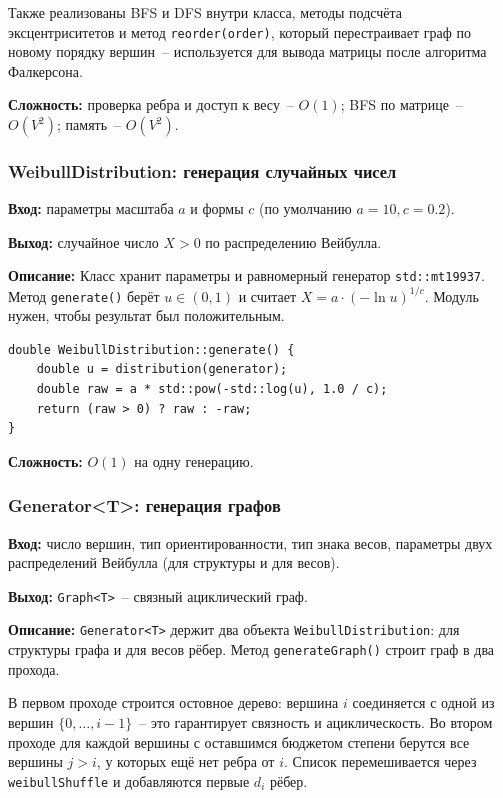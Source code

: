 Также реализованы BFS и DFS внутри класса, методы подсчёта эксцентриситетов
и метод \texttt{reorder(order)}, который перестраивает граф по новому порядку
вершин~-- используется для вывода матрицы после алгоритма Фалкерсона.

\textbf{Сложность:} проверка ребра и доступ к весу~-- $O(1)$;
BFS по матрице~-- $O(V^2)$; память~-- $O(V^2)$.

\subsubsection{WeibullDistribution: генерация случайных чисел}

\textbf{Вход:} параметры масштаба $a$ и формы $c$ (по умолчанию $a=10, c=0.2$).

\textbf{Выход:} случайное число $X > 0$ по распределению Вейбулла.

\textbf{Описание:} Класс хранит параметры и равномерный генератор
\texttt{std::mt19937}. Метод \texttt{generate()} берёт $u \in (0,1)$
и считает $X = a \cdot (-\ln u)^{1/c}$.
Модуль нужен, чтобы результат был положительным.

\begin{lstlisting}[style=cstyle, caption={Генерация числа по распределению Вейбулла (weibull.cpp)}]
double WeibullDistribution::generate() {
    double u = distribution(generator);
    double raw = a * std::pow(-std::log(u), 1.0 / c);
    return (raw > 0) ? raw : -raw;
}
\end{lstlisting}

\textbf{Сложность:} $O(1)$ на одну генерацию.

\subsubsection{Generator\textless T\textgreater: генерация графов}

\textbf{Вход:} число вершин, тип ориентированности, тип знака весов,
параметры двух распределений Вейбулла (для структуры и для весов).

\textbf{Выход:} \texttt{Graph<T>}~-- связный ациклический граф.

\textbf{Описание:} \texttt{Generator<T>} держит два объекта
\texttt{WeibullDistribution}: для структуры графа и для весов рёбер.
Метод \texttt{generateGraph()} строит граф в два прохода.

В первом проходе строится остовное дерево: вершина $i$ соединяется
с одной из вершин $\{0, \ldots, i-1\}$~-- это гарантирует связность
и ациклическость.
Во втором проходе для каждой вершины с оставшимся бюджетом степени
берутся все вершины $j > i$, у которых ещё нет ребра от $i$.
Список перемешивается через \texttt{weibullShuffle} и добавляются
первые $d_i$ рёбер.

